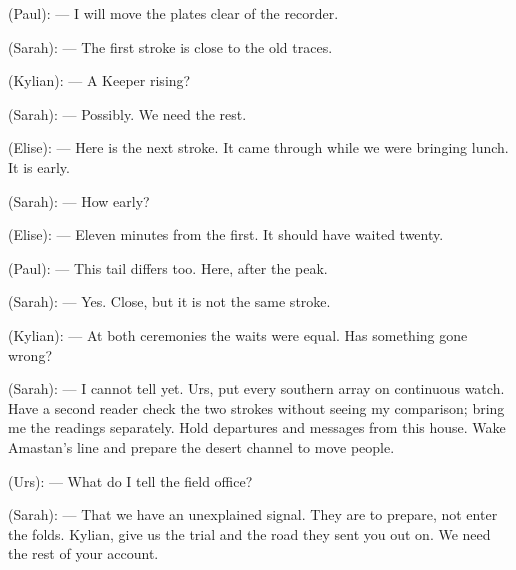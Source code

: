 \begin{room}
(Paul): --- I will move the plates clear of the recorder.

(Sarah): --- The first stroke is close to the old traces.

(Kylian): --- A Keeper rising?

(Sarah): --- Possibly. We need the rest.

(Elise): --- Here is the next stroke. It came through while we were bringing lunch. It is early.

(Sarah): --- How early?

(Elise): --- Eleven minutes from the first. It should have waited twenty.

(Paul): --- This tail differs too. Here, after the peak.

(Sarah): --- Yes. Close, but it is not the same stroke.

(Kylian): --- At both ceremonies the waits were equal. Has something gone wrong?

(Sarah): --- I cannot tell yet. Urs, put every southern array on continuous watch. Have a second reader check the two strokes without seeing my comparison; bring me the readings separately. Hold departures and messages from this house. Wake Amastan's line and prepare the desert channel to move people.

(Urs): --- What do I tell the field office?

(Sarah): --- That we have an unexplained signal. They are to prepare, not enter the folds. Kylian, give us the trial and the road they sent you out on. We need the rest of your account.

\end{room}
